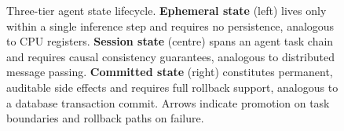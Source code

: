 \begin{figure}[htbp]
{}%
\caption{Three-tier agent state lifecycle. \textbf{Ephemeral state} (left) lives only within a single inference step and requires no persistence, analogous to CPU registers. \textbf{Session state} (centre) spans an agent task chain and requires causal consistency guarantees, analogous to distributed message passing. \textbf{Committed state} (right) constitutes permanent, auditable side effects and requires full rollback support, analogous to a database transaction commit. Arrows indicate promotion on task boundaries and rollback paths on failure.}
\label{fig:state_lifecycle}
\end{figure}
